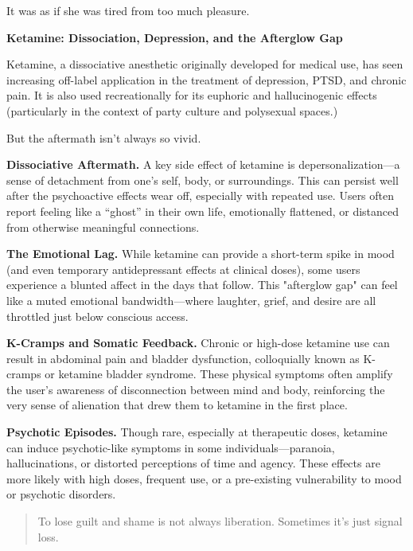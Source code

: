 It was as if she was tired from too much pleasure.

\begin{TechnicalSidebar}{\textbf{Ketamine: Dissociation, Depression, and the Afterglow Gap}}

  Ketamine, a dissociative anesthetic originally developed for medical use, has seen increasing 
  off-label application in the treatment of depression, PTSD, and chronic pain. It is also used 
  recreationally for its euphoric and hallucinogenic effects (particularly in the context of 
  party culture and polysexual spaces.)

  \medskip
  
  But the aftermath isn’t always so vivid.

  \medskip
  
  \textbf{Dissociative Aftermath.}
  A key side effect of ketamine is depersonalization—a sense of detachment from one’s self, body, 
  or surroundings. This can persist well after the psychoactive effects wear off, especially with 
  repeated use. Users often report feeling like a ``ghost'' in their own life, emotionally flattened, 
  or distanced from otherwise meaningful connections.

  \medskip
  
  \textbf{The Emotional Lag.}
  While ketamine can provide a short-term spike in mood (and even temporary antidepressant effects 
  at clinical doses), some users experience a blunted affect in the days that follow. This "afterglow 
  gap" can feel like a muted emotional bandwidth—where laughter, grief, and desire are all throttled 
  just below conscious access.
  
  \medskip

  \textbf{K-Cramps and Somatic Feedback.}
  Chronic or high-dose ketamine use can result in abdominal pain and bladder dysfunction, colloquially 
  known as K-cramps or ketamine bladder syndrome. These physical symptoms often amplify the user's 
  awareness of disconnection between mind and body, reinforcing the very sense of alienation that 
  drew them to ketamine in the first place.

  \medskip

  \textbf{Psychotic Episodes.}
  Though rare, especially at therapeutic doses, ketamine can induce psychotic-like symptoms in some 
  individuals—paranoia, hallucinations, or distorted perceptions of time and agency. These effects 
  are more likely with high doses, frequent use, or a pre-existing vulnerability to mood or 
  psychotic disorders.
  
  \begin{quote}
  To lose guilt and shame is not always liberation. Sometimes it’s just signal loss.
  \end{quote}

\end{TechnicalSidebar}


